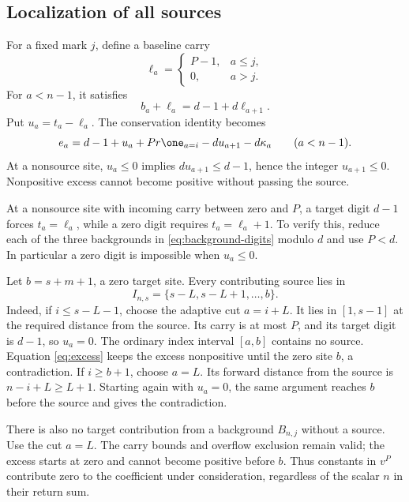\subsection{Localization of all sources}

For a fixed mark $j$, define a baseline carry
\[
 \ell_a=\begin{cases}P-1,&a\le j,\\0,&a>j.
 \end{cases}
\]
For $a<n-1$, it satisfies
\begin{equation}
 b_a+\ell_a=d-1+d\ell_{a+1}.
 \label{eq:baseline}
\end{equation}
Put $u_a=t_a-\ell_a$. The conservation identity becomes
\begin{equation}
 e_a=d-1+u_a+Pr\one_{a=i}-du_{a+1}-d\kappa_a
                  \qquad(a<n-1).
 \label{eq:excess}
\end{equation}
At a nonsource site, $u_a\le0$ implies
$du_{a+1}\le d-1$, hence the integer $u_{a+1}\le0$.
Nonpositive excess cannot become positive without passing the source.

At a nonsource site with incoming carry between zero and $P$,
a target digit $d-1$ forces $t_a=\ell_a$, while a zero digit
requires $t_a=\ell_a+1$. To verify this, reduce each of the
three backgrounds in \eqref{eq:background-digits} modulo $d$
and use $P<d$. In particular a zero digit is impossible when
$u_a\le0$.

Let $b=s+m+1$, a zero target site. Every contributing source lies in
\begin{equation}
 I_{n,s}=\{s-L,s-L+1,\ldots,b\}.
 \label{eq:hasse-source-interval}
\end{equation}
Indeed, if $i\le s-L-1$, choose the adaptive cut $a=i+L$.
It lies in $[1,s-1]$ at the required distance from the source.
Its carry is at most $P$, and its target digit is $d-1$,
so $u_a=0$. The ordinary index interval $[a,b]$ contains
no source. Equation \eqref{eq:excess} keeps the excess nonpositive
until the zero site $b$, a contradiction. If $i\ge b+1$,
choose $a=L$. Its forward distance from the source is
$n-i+L\ge L+1$. Starting again with $u_a=0$, the same
argument reaches $b$ before the source and gives the contradiction.

There is also no target contribution from a background $B_{n,j}$
without a source. Use the cut $a=L$. The carry bounds and
overflow exclusion remain valid; the excess starts at zero and
cannot become positive before $b$. Thus constants in $v^P$
contribute zero to the coefficient under consideration, regardless
of the scalar $n$ in their return sum.

